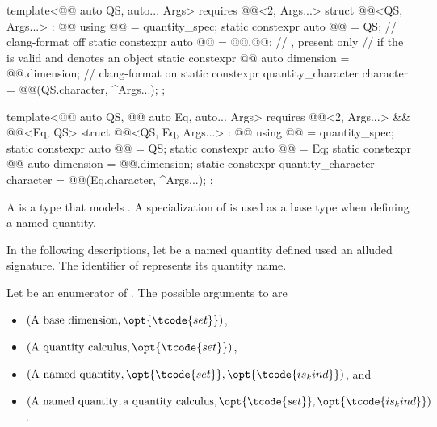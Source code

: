 \begin{codeblock}
{template<@@ auto QS, auto... Args>
  requires @@<2, Args...>
struct @@<QS, Args...> : @@ {
  using @@ = quantity_spec;
  static constexpr auto @@ = QS;  // clang-format off
  static constexpr auto @@ = @@.@@;  // \expos, present only
    // if the   is valid and denotes an object
  static constexpr @@ auto dimension = @@.dimension;  // clang-format on
  static constexpr quantity_character character =
    @@(QS.character, {^Args...});
};

template<@@ auto QS, @@ auto Eq, auto... Args>
  requires @@<2, Args...> && @@<Eq, QS>
struct @@<QS, Eq, Args...> : @@ {
  using @@ = quantity_spec;
  static constexpr auto @@ = QS;
  static constexpr auto @@ = Eq;
  static constexpr @@ auto dimension = @@.dimension;
  static constexpr quantity_character character =
    @@(Eq.character, {^Args...});
};

}
\end{codeblock}

\pnum
A  is a type that models .
A specialization of  is used as a base type when defining a named quantity.

\pnum
In the following descriptions, let  be a named quantity defined used an alluded signature.
The identifier of  represents its quantity name.

\pnum
Let  be an enumerator of .
The possible arguments to  are
\begin{itemize}
\item
$(\text{A base dimension}, \opt{\tcode{set}})$,
\item
$(\text{A quantity calculus}, \opt{\tcode{set}})$,
\item
$(\text{A named quantity}, \opt{\tcode{set}}, \opt{\tcode{is_kind}})$, and
\item
$(\text{A named quantity}, \text{a quantity calculus}, \opt{\tcode{set}}, \opt{\tcode{is_kind}})$.
\end{itemize}

